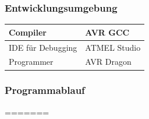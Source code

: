 \subsubsection*{Entwicklungsumgebung}
\begin{center}
	\begin{tabular}{ | l | l | }
		\hline
		Compiler & AVR GCC \\ \hline
		IDE für Debugging & ATMEL Studio \\ \hline
		Programmer & AVR Dragon \\ \hline
	\end{tabular}
\end{center}


\subsubsection*{Programmablauf}
=======


